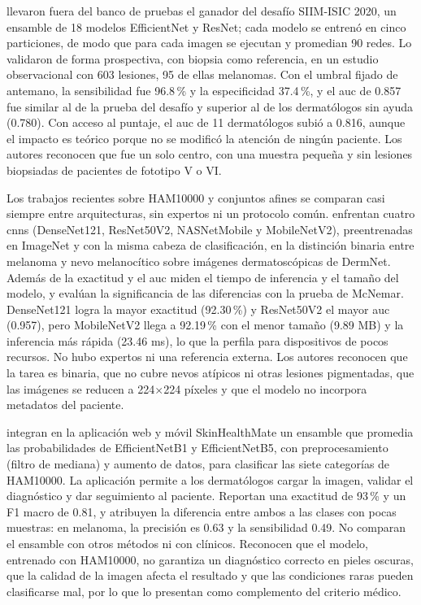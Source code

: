 \textcite{marchetti2023prospective} llevaron fuera del banco de pruebas el ganador del desafío SIIM-ISIC 2020,
un ensamble de 18 modelos EfficientNet y ResNet; cada modelo se entrenó en cinco
particiones, de modo que para cada imagen se ejecutan y promedian 90 redes. Lo validaron de forma
prospectiva, con biopsia como referencia, en un estudio observacional con 603 lesiones, 95 de ellas melanomas. Con
el umbral fijado de antemano, la sensibilidad fue 96.8\,\% y la especificidad 37.4\,\%, y el \gls{auc} de 0.857 fue
similar al de la prueba del desafío y superior al de los dermatólogos sin ayuda (0.780). Con acceso al puntaje, el
\gls{auc} de 11 dermatólogos subió a 0.816, aunque el impacto es teórico porque no se modificó la atención de ningún
paciente. Los autores reconocen que fue un solo centro, con una muestra pequeña y sin lesiones biopsiadas de pacientes de
fototipo V o VI.

Los trabajos recientes sobre HAM10000 y conjuntos afines se comparan casi siempre entre arquitecturas, sin expertos
ni un protocolo común. \textcite{kreouzi2024learning} enfrentan cuatro \glspl{cnn} (DenseNet121, ResNet50V2,
NASNetMobile y MobileNetV2), preentrenadas en ImageNet y con la misma cabeza de clasificación, en la distinción binaria
entre melanoma y nevo melanocítico sobre imágenes dermatoscópicas de DermNet. Además de la exactitud y el \gls{auc}
miden el tiempo de inferencia y el tamaño del modelo, y evalúan la significancia de las diferencias con la prueba de
McNemar. DenseNet121 logra la mayor exactitud (92.30\,\%) y ResNet50V2 el mayor \gls{auc} (0.957), pero MobileNetV2
llega a 92.19\,\% con el menor tamaño (9.89 MB) y la inferencia más rápida (23.46 ms), lo que la perfila para
dispositivos de pocos recursos. No hubo expertos ni una referencia externa. Los autores reconocen que la tarea es
binaria, que no cubre nevos atípicos ni otras lesiones pigmentadas, que las imágenes se reducen a 224$\times$224
píxeles y que el modelo no incorpora metadatos del paciente.

\textcite{aboulmira2024skinhealthmate} integran en la aplicación web y móvil SkinHealthMate un ensamble que promedia
las probabilidades de EfficientNetB1 y EfficientNetB5, con preprocesamiento (filtro de mediana) y aumento de datos,
para clasificar las siete categorías de HAM10000. La aplicación permite a los dermatólogos cargar la imagen, validar
el diagnóstico y dar seguimiento al paciente. Reportan una exactitud de 93\,\% y un F1 macro de 0.81, y atribuyen la
diferencia entre ambos a las clases con pocas muestras: en melanoma, la precisión es 0.63 y la sensibilidad 0.49. No
comparan el ensamble con otros métodos ni con clínicos. Reconocen que el modelo, entrenado con HAM10000, no garantiza
un diagnóstico correcto en pieles oscuras, que la calidad de la imagen afecta el resultado y que las condiciones
raras pueden clasificarse mal, por lo que lo presentan como complemento del criterio médico.

